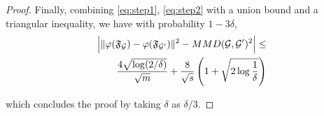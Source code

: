 \begin{appendices}
\begin{proof}
Finally, combining \eqref{eq:step1}, \eqref{eq:step2} with a union bound and a triangular inequality, we have with probability $1-3\delta$,
\begin{align*}
\Big|\|\varphi(\mathfrak{F}_{\mathcal{G}}) - \varphi(\mathfrak{F}_{\mathcal{G}'})\|^2 - MMD(\mathcal{G},\mathcal{G}')^2 \Big| \leq \\\frac{4 \sqrt{\log (2/\delta)}}{\sqrt{m}} + \frac{8}{\sqrt{{s}}}\left(1+\sqrt{2\log\frac{1}{\delta}}\right)
\end{align*}

which concludes the proof by taking $\delta$ as $\delta/3$.

\end{proof}
\end{appendices}